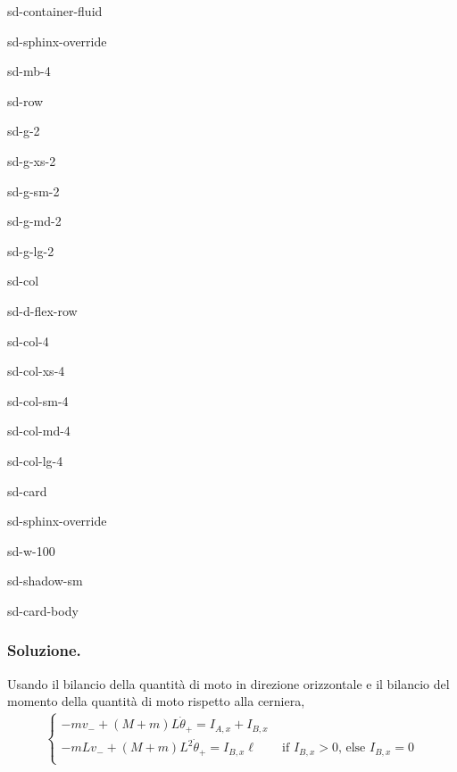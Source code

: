 \documentclass[letterpaper,10pt,italian]{jupyterBook}
\begin{document}
\begin{sphinxuseclass}{sd-container-fluid}
\begin{sphinxuseclass}{sd-sphinx-override}
\begin{sphinxuseclass}{sd-mb-4}
\begin{sphinxuseclass}{sd-row}
\begin{sphinxuseclass}{sd-g-2}
\begin{sphinxuseclass}{sd-g-xs-2}
\begin{sphinxuseclass}{sd-g-sm-2}
\begin{sphinxuseclass}{sd-g-md-2}
\begin{sphinxuseclass}{sd-g-lg-2}
\begin{sphinxuseclass}{sd-col}
\begin{sphinxuseclass}{sd-d-flex-row}
\begin{sphinxuseclass}{sd-col-4}
\begin{sphinxuseclass}{sd-col-xs-4}
\begin{sphinxuseclass}{sd-col-sm-4}
\begin{sphinxuseclass}{sd-col-md-4}
\begin{sphinxuseclass}{sd-col-lg-4}
\begin{sphinxuseclass}{sd-card}
\begin{sphinxuseclass}{sd-sphinx-override}
\begin{sphinxuseclass}{sd-w-100}
\begin{sphinxuseclass}{sd-shadow-sm}
\begin{sphinxuseclass}{sd-card-body}
\end{sphinxuseclass}
\end{sphinxuseclass}
\end{sphinxuseclass}
\end{sphinxuseclass}
\end{sphinxuseclass}
\end{sphinxuseclass}
\end{sphinxuseclass}
\end{sphinxuseclass}
\end{sphinxuseclass}
\end{sphinxuseclass}
\end{sphinxuseclass}
\end{sphinxuseclass}
\end{sphinxuseclass}
\end{sphinxuseclass}
\end{sphinxuseclass}
\end{sphinxuseclass}
\end{sphinxuseclass}
\end{sphinxuseclass}
\end{sphinxuseclass}
\end{sphinxuseclass}
\end{sphinxuseclass}\subsubsection*{Soluzione.}

\sphinxAtStartPar
{} Usando il bilancio della quantità di moto in direzione orizzontale e il bilancio del momento della quantità di moto rispetto alla cerniera,
\begin{equation*}
\begin{split}\begin{cases}
  - m v_-   + ( M + m ) L   \dot{\theta}_+ = I_{A,x} + I_{B,x} \\
  - m L v_- + ( M + m ) L^2 \dot{\theta}_+ = I_{B,x} \ell \qquad \text{if $I_{B,x} > 0$, else $I_{B,x} = 0$}  \\
\end{cases}\end{split}
\end{equation*}
\sphinxAtStartPar
{}
\end{document}
